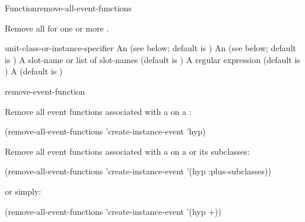 \documentclass[10pt,twoside,english,pdftex]{article}
\begin{document}
\begin{functiondoc}{Function}{remove-all-event-functions}%
  {\nobr{[\var{event-class-specifier\/}}
    \nobr{[\var{unit-class-or-instance-specifier\/}]]}
    }
%


\fnsyntax

\fnpurpose Remove all  for one or more .

\fnpackage {}

\fnmodule {}

\fnargs
\begin{args}{unit-class-or-instance-specifier}
 An  
(see below; default is )
 An 
(see below; default is )
 A slot-name or list of slot-names
(default is )
 A  regular expression
(default is \code{(*)})
\arg[permanent] A  (default is \nil)
\end{args}

\fndsyntax
\W\supp\tabletop
\eventclassspec
\subeventingspec
\syntaxsep
\unitclassinstancespec
\subclassingspec

\begin{alsos}{remove-event-function}
\end{alsos}

\fnexamples
{}%
Remove all event functions associated with a
 on a  :
%
\W\supp
\begin{example}
  (remove-all-event-functions 'create-instance-event 'hyp)
\end{example}
%
Remove all event functions associated with a
 on a   or
its subclasses:
%
\W\supp\notpretop
\begin{example}
  (remove-all-event-functions 'create-instance-event '(hyp :plus-subclasses))
\end{example}
%
or simply:
%
\W\supp\notpretop
\begin{example}
  (remove-all-event-functions 'create-instance-event '(hyp +))
\end{example}

\fnnote
\instanceevfnsnyi

\end{functiondoc}
\end{document}
